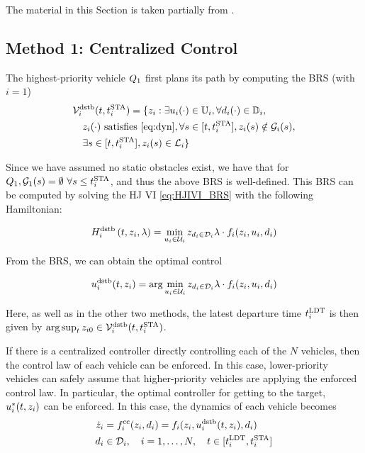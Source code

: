 The material in this Section is taken partially from \cite{Bansal2017}.

\subsection{Method 1: Centralized Control \label{sec:cc}}
The highest-priority vehicle $Q_1$ first plans its path by computing the BRS (with $i=1$)
\begin{equation}
\label{eq:BRS}
\begin{aligned}
&\brs_i^\text{dstb}(t, \sta_i) = \{\state_i: \exists \ctrl_i(\cdot) \in \cfset_i, \forall \dstb_i(\cdot) \in \dfset_i, \\
&\quad\state_i(\cdot) \text{ satisfies \eqref{eq:dyn}}, \forall s \in [t, \sta_i], \state_i(s) \notin \obsset_i(s), \\
&\quad\exists s \in [t, \sta_i], \state_i(s) \in \targetset_i\}
\end{aligned}
\end{equation}

Since we have assumed no static obstacles exist, we have that for $Q_1, \mathcal{G}_1(s)=\emptyset ~ \forall s \le t^\text{STA}_i$, and thus the above BRS is well-defined. This BRS can be computed by solving the HJ VI \eqref{eq:HJIVI_BRS} with the following Hamiltonian:

\begin{equation}
H_i^\text{dstb}\left(t, z_i, \lambda\right) = \min_{u_i \in \mathcal{U}_i} z_{d_i \in \mathcal{D}_i} \lambda \cdot f_i(z_i, u_i, d_i)
\end{equation}

From the BRS, we can obtain the optimal control

\begin{equation}
\label{eq:opt_ctrl_i}
\ctrl_i^\text{dstb}(t,\state_i) =  \arg \min_{\ctrl_i \in \cset_i} \state_{\dstb_i \in \dset_i} \costate \cdot \fdyn_i(\state_i, \ctrl_i, \dstb_i)
\end{equation}

Here, as well as in the other two methods, the latest departure time $t^\text{LDT}_i$ is then given by $\arg \sup_t z_{i0} \in \mathcal{V}_i^\text{dstb}(t, t^\text{STA}_i)$.

If there is a centralized controller directly controlling each of the $N$ vehicles, then the control law of each vehicle can be enforced. In this case, lower-priority vehicles can safely assume that higher-priority vehicles are applying the enforced control law. In particular, the optimal controller for getting to the target, $u^*_i(t, z_i)$ can be enforced. In this case, the dynamics of each vehicle becomes 
\vspace{-0.3em}
\begin{equation}
\label{eq:dyn_cc}
\begin{aligned}
\dot \state_i &= \fdyn^\text{cc}_i (\state_i, \dstb_i) = \fdyn_i(\state_i, \ctrl^\text{dstb}_i(t,\state_i), \dstb_i) \\
\dstb_i &\in \dset_i, \quad i = 1,\ldots, N, \quad t \in [\ldt_i, \sta_i]
\end{aligned}
\end{equation}

